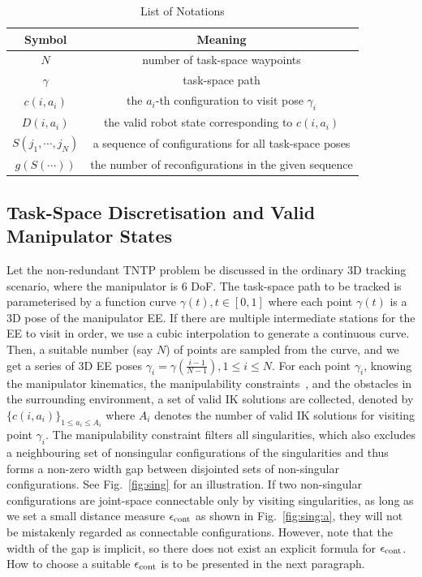 \documentclass[letterpaper, 10 pt, conference]{ieeeconf}  %
\begin{document}
\begin{table}
\begin{center}
\caption{List of Notations}
\label{tab:notations}
\begin{tabular}{ c | c }
\hline
Symbol & Meaning\\
\hline
\hline
$N$ & number of task-space waypoints\\
\hline
$\gamma$ & task-space path\\ 
\hline
$c(i, a_i)$ & the $a_i$-th configuration to visit pose $\gamma_i$\\
\hline
$D(i, a_i)$ & the valid robot state corresponding to $c(i, a_i)$\\
\hline
$S(j_1, \cdots, j_N)$ & a sequence of configurations for all task-space poses\\
\hline
$g(S(\cdots))$ & the number of reconfigurations in the given sequence\\
\hline 
\end{tabular}
\end{center}
\vspace{-0.5cm}
\end{table}

\subsection{Task-Space Discretisation and Valid Manipulator States}
Let the non-redundant TNTP problem be discussed in the ordinary 3D tracking scenario, where the manipulator is 6 DoF. 
The task-space path to be tracked is parameterised by a function curve $\gamma(t), t\in [0, 1]$ where each point $\gamma(t)$ is a 3D pose of the manipulator EE. 
If there are multiple intermediate stations for the EE to visit in order, we use a cubic interpolation to generate a continuous curve. 
Then, a suitable number (say $N$) of points are sampled from the curve, and we get a series of 3D EE poses $\gamma_i = \gamma(\frac{i-1}{N-1}), 1\leq i\leq N$. 
For each point $\gamma_i$, knowing the manipulator kinematics, the manipulability constraints~\cite{yoshikawa1990translational}, and the obstacles in the surrounding environment, a set of valid IK solutions are collected, denoted by $\{c(i, a_i)\}_{1\leq a_i\leq A_i}$ where $A_i$ denotes the number of valid IK solutions for visiting point $\gamma_i$. 
The manipulability constraint filters all singularities, which also excludes a neighbouring set of nonsingular configurations of the singularities and thus forms a non-zero width gap between disjointed sets of non-singular configurations. 
See Fig.~\ref{fig:sing} for an illustration.
If two non-singular configurations are joint-space connectable only by visiting singularities, as long as we set a small distance measure $\epsilon_{\rm cont}$ as shown in Fig.~\ref{fig:sing:a}, they will not be mistakenly regarded as connectable configurations. 
However, note that the width of the gap is implicit, so there does not exist an explicit formula for $\epsilon_{\rm cont}$. How to choose a suitable $\epsilon_{\rm cont}$ is to be presented in the next paragraph. 
\end{document}
